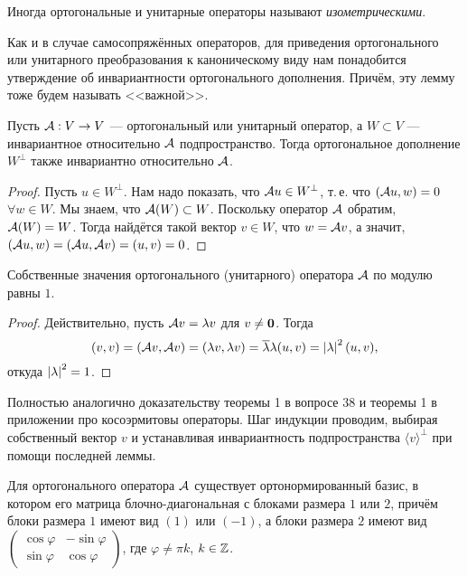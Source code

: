 Иногда ортогональные и унитарные операторы называют \textit{изометрическими}.

Как и в случае самосопряжённых операторов, для приведения ортогонального или унитарного преобразования к каноническому виду нам понадобится утверждение об инвариантности ортогонального дополнения. Причём, эту лемму тоже будем называть <<важной>>.

\begin{lemma}[Важная]
    Пусть $\mathcal{A}: V \to V$ --- ортогональный или унитарный оператор, а $W \subset V$ --- инвариантное относительно $\mathcal{A}$ подпространство. Тогда ортогональное дополнение $W^\perp$ также инвариантно относительно $\mathcal{A}$.
\end{lemma}

\begin{proof}
    Пусть $u \in W^\perp$. Нам надо показать, что $\mathcal{A} u \in W^\perp$, т.\,е. что $(\mathcal{A} u, w) = 0$ $\forall w \in W$. Мы знаем, что $\mathcal{A}(W) \subset W$. Поскольку оператор $\mathcal{A}$ обратим, $\mathcal{A}(W) = W$. Тогда найдётся такой вектор $v \in W$, что $w = \mathcal{A} v$, а значит, $(\mathcal{A} u, w) = (\mathcal{A} u, \mathcal{A} v) = (u, v) = 0$.
\end{proof}

\begin{lemma}
    Собственные значения ортогонального (унитарного) оператора $\mathcal{A}$ по модулю равны $1$.
\end{lemma}

\begin{proof}
    Действительно, пусть $\mathcal{A} v = \lambda v$ для $v \ne \boldsymbol{0}$. Тогда
    \[
        (v, v) = (\mathcal{A} v, \mathcal{A} v) = (\lambda v, \lambda v) = \overline{\lambda}\lambda(u, v) = \left\lvert\lambda\right\rvert^2(u, v),
    \]
    откуда $\left\lvert\lambda\right\rvert^2 = 1$.
\end{proof}

\begin{theorem}
    Полностью аналогично доказательству теоремы 1 в вопросе 38 и теоремы 1 в приложении про косоэрмитовы операторы. Шаг индукции проводим, выбирая собственный вектор $v$ и устанавливая инвариантность подпространства $\langle v\rangle^\perp$ при помощи последней леммы.
\end{theorem}

\begin{theorem}
    Для ортогонального оператора $\mathcal{A}$ существует ортонормированный базис, в котором его матрица блочно-диагональная с блоками размера $1$ или $2$, причём блоки размера $1$ имеют вид $(1)$ или $(-1)$, а блоки размера $2$ имеют вид
    $
    \begin{pmatrix}
        \cos\varphi & -\sin\varphi\\
        \sin\varphi & \cos\varphi
    \end{pmatrix}
    $, где $\varphi \ne \pi k$, $k \in \mathbb{Z}$.
\end{theorem}


